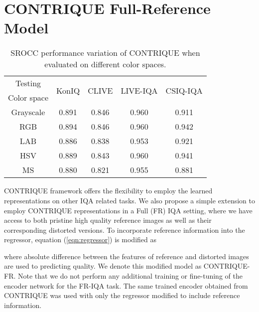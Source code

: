 \documentclass[journal]{IEEEtran}
\begin{document}
\section{CONTRIQUE Full-Reference Model}
\begin{table}[t]
    \caption{SROCC performance variation of CONTRIQUE when evaluated on different color spaces.}
    \label{table:testing_colorspace}
    \centering
    \footnotesize
        \begin{tabular}{|c||c|c|c|c|}
        \hline
        Testing & \multirow{2}{*}{KonIQ} & \multirow{2}{*}{CLIVE} & \multirow{2}{*}{LIVE-IQA} & \multirow{2}{*}{CSIQ-IQA} \\
        Color space & ~ & ~ & ~ & ~ \\ \hline \hline
        Grayscale & 0.891 & 0.846 & 0.960 & 0.911 \\
        RGB & 0.894 & 0.846 & 0.960 & 0.942 \\
        LAB & 0.886 & 0.838 & 0.953 & 0.921 \\
        HSV & 0.889 & 0.843 & 0.960 & 0.941 \\
        MS & 0.880 & 0.821 & 0.955 & 0.881 \\
        \hline
    \end{tabular}
\end{table}
CONTRIQUE framework offers the flexibility to employ the learned representations on other IQA related tasks. We also propose a simple extension to employ CONTRIQUE representations in a Full (FR) IQA setting, where we have access to both pristine high quality reference images as well as their corresponding distorted versions. To incorporate reference information into the regressor, equation (\ref{eqn:regressor}) is modified as


where absolute difference between the features of reference and distorted images are used to predicting quality. We denote this modified model as CONTRIQUE-FR. Note that we do not perform any additional training or fine-tuning of the encoder network for the FR-IQA task. The same trained encoder obtained from CONTRIQUE was used with only the regressor modified to include reference information.
\end{document}
